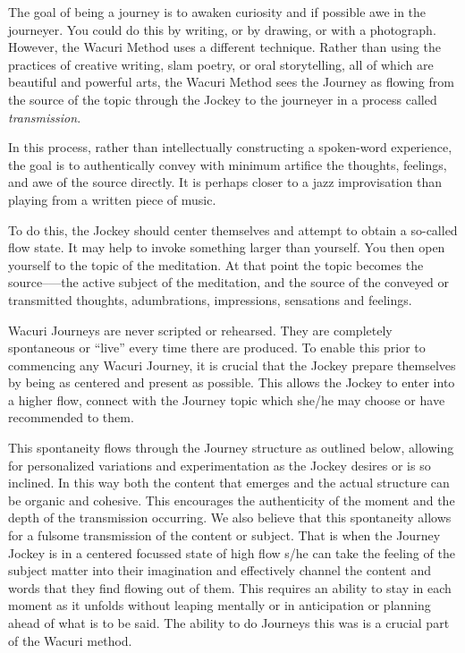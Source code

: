 \documentclass[12pt]{book}
\begin{document}
The goal of being a journey is to awaken curiosity and if possible awe in the journeyer.
You could do this by writing, or by drawing, or with a photograph.
However, the Wacuri Method uses a different technique. Rather than using the practices of creative writing,
slam poetry, or oral storytelling, all of which are beautiful and powerful arts, the Wacuri Method sees the Journey
as flowing from the source of the topic through the Jockey to the journeyer in a process called {\em transmission}.
					
In this process, rather than intellectually constructing a spoken-word experience, the goal is to authentically convey with minimum artifice the thoughts, feelings, and awe of the source directly. It is perhaps closer to a jazz improvisation than playing from a written piece of music.
					
To do this, the Jockey should center themselves and attempt to obtain a so-called flow state. It may help to invoke something larger than yourself. You then open yourself to the topic of the meditation. At that point the topic becomes the source--—the active subject of the meditation, and the source of the conveyed or transmitted thoughts, adumbrations, impressions, sensations and feelings.

Wacuri Journeys are never scripted or rehearsed. They are
completely spontaneous or “live” every time there are produced. To
enable this prior to commencing any Wacuri Journey, it is crucial that
the Jockey prepare themselves by being as centered and present as
possible. This allows the Jockey to enter into a higher flow, connect
with the Journey topic which she/he may choose or have recommended to
them.

This spontaneity flows through the Journey structure as outlined
below, allowing for personalized variations and experimentation as the
Jockey desires or is so inclined. In this way both the content that
emerges and the actual structure can be organic and cohesive. This
encourages the authenticity of the moment and the depth of the
transmission occurring.  We also believe that this spontaneity allows
for a fulsome transmission of the content or subject. That is when the
Journey Jockey is in a centered focussed state of high flow s/he can
take the feeling of the subject matter into their imagination and
effectively channel the content and words that they find flowing out
of them. This requires an ability to stay in each moment as it
unfolds without leaping mentally or in anticipation or planning ahead
of what is to be said.  The ability to do Journeys this was is a
crucial part of the Wacuri method.
					
\end{document}

